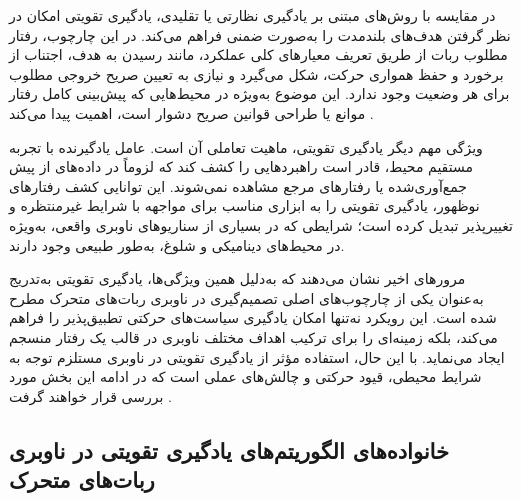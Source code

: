 در مقایسه با روش‌های مبتنی بر یادگیری نظارتی یا تقلیدی، یادگیری تقویتی امکان در نظر گرفتن هدف‌های بلندمدت را به‌صورت ضمنی فراهم می‌کند. در این چارچوب، رفتار مطلوب ربات از طریق تعریف معیارهای کلی عملکرد، مانند رسیدن به هدف، اجتناب از برخورد و حفظ همواری حرکت، شکل می‌گیرد و نیازی به تعیین صریح خروجی مطلوب برای هر وضعیت وجود ندارد. این موضوع به‌ویژه در محیط‌هایی که پیش‌بینی کامل رفتار موانع یا طراحی قوانین صریح دشوار است، اهمیت پیدا می‌کند%
\cite{Zhu2021}.

ویژگی مهم دیگر یادگیری تقویتی، ماهیت تعاملی آن است. عامل یادگیرنده با تجربه مستقیم محیط، قادر است راهبردهایی را کشف کند که لزوماً در داده‌های از پیش جمع‌آوری‌شده یا رفتارهای مرجع مشاهده نمی‌شوند. این توانایی کشف رفتارهای نوظهور، یادگیری تقویتی را به ابزاری مناسب برای مواجهه با شرایط غیرمنتظره و تغییرپذیر تبدیل کرده است؛ شرایطی که در بسیاری از سناریوهای ناوبری واقعی، به‌ویژه در محیط‌های دینامیکی و شلوغ، به‌طور طبیعی وجود دارند.

مرورهای اخیر نشان می‌دهند که به‌دلیل همین ویژگی‌ها، یادگیری تقویتی به‌تدریج به‌عنوان یکی از چارچوب‌های اصلی تصمیم‌گیری در ناوبری ربات‌های متحرک مطرح شده است. این رویکرد نه‌تنها امکان یادگیری سیاست‌های حرکتی تطبیق‌پذیر را فراهم می‌کند، بلکه زمینه‌ای را برای ترکیب اهداف مختلف ناوبری در قالب یک رفتار منسجم ایجاد می‌نماید. با این حال، استفاده مؤثر از یادگیری تقویتی در ناوبری مستلزم توجه به شرایط محیطی، قیود حرکتی و چالش‌های عملی است که در ادامه این بخش مورد بررسی قرار خواهند گرفت%
\cite{s25113394}.
\subsection{خانواده‌های الگوریتم‌های یادگیری تقویتی در ناوبری ربات‌های متحرک}

